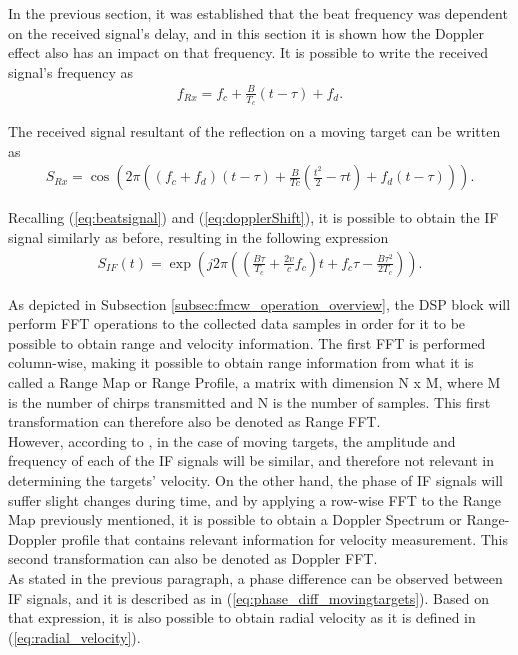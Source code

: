 In the previous section, it was established that the beat frequency was dependent on the received signal's delay, and in this section it is shown how the Doppler effect also has an impact on that frequency. It is possible to write the received signal's frequency as
\begin{equation}
    \begin{gathered}
        \label{eq:newBeatFrew}
        f_{Rx} = f_c + \frac{B}{T_c} (t - \tau) + f_d.
   \end{gathered}
 \end{equation}
 
The received signal resultant of the reflection on a moving target can be written as
\begin{equation}
    \begin{gathered}
        \label{eq:SRxMovingTarget}
        S_{Rx} = \cos \left(  2\pi\left( (f_c + f_d ) (t- \tau) + \frac{B}{Tc} \left(\frac{t^2}{2} - \tau t\right) + f_d (t- \tau)\right)\right).
   \end{gathered}
 \end{equation}
 
 Recalling (\ref{eq:beatsignal}) and (\ref{eq:dopplerShift}), it is possible to obtain the \gls{IF} signal similarly as before, resulting in the following expression
\begin{equation}
    \begin{gathered}
        \label{eq:IFsignalMovement}
        S_{IF}(t)  =  \exp \left(j2\pi \left( \left(\frac{B\tau }{T_c} + \frac{2v}{c}f_c\right)t+ f_c \tau - \frac{B \tau^2}{2T_c} \right)\right).
   \end{gathered}
 \end{equation}

As depicted in Subsection \ref{subsec:fmcw_operation_overview}, the \gls{DSP} block will perform \gls{FFT} operations to the collected data samples in order for it to be possible to obtain range and velocity information.
The first \gls{FFT} is performed column-wise, making it possible to obtain range information from what it is called a Range Map or Range Profile, a matrix with dimension N x M, where M is the number of chirps transmitted and N is the number of samples. This first transformation can therefore also be denoted as Range FFT. \\
However, according to \cite{velocityRadar}, in the case of moving targets, the amplitude and frequency of each of the IF signals will be similar, and therefore not relevant in determining the targets' velocity. On the other hand, the phase of \gls{IF} signals will suffer slight changes during time, and by applying a row-wise \gls{FFT} to the Range Map previously mentioned, it is possible to obtain a Doppler Spectrum or Range-Doppler profile that contains relevant information for velocity measurement. This second transformation can also be denoted as Doppler FFT.\\
As stated in the previous paragraph, a phase difference can be observed between IF signals, and it is described as in (\ref{eq:phase_diff_movingtargets}). Based on that expression, it is also possible to obtain radial velocity as it is defined in (\ref{eq:radial_velocity}).


